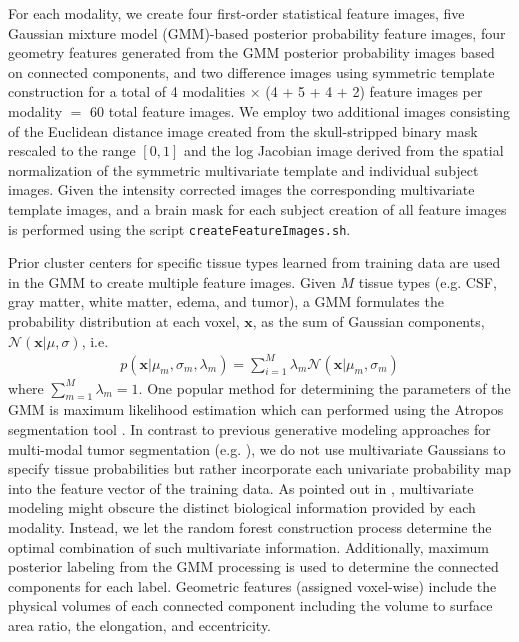 \documentclass[final,5p,times,twocolumn]{elsarticle}
\begin{document}
For each modality, we create four first-order statistical feature images,
five Gaussian mixture model (GMM)-based posterior probability feature images,
four geometry features generated from the GMM posterior probability images
based on connected components, and two difference images using symmetric template
construction for a total of 4 modalities $\times$ (4 + 5 + 4 + 2) feature images per modality $=$ 60 total
feature images.  We employ two additional images consisting of the 
Euclidean distance image \cite{maurer2003} created from the skull-stripped 
binary mask rescaled to the range $[0,1]$ and the log
Jacobian image derived from the spatial normalization of the symmetric multivariate template and individual subject images.  Given the intensity corrected images
the corresponding multivariate template images, and a brain mask for each subject
creation of all feature images is performed using the script \verb#createFeatureImages.sh#.

Prior  cluster centers for specific tissue types learned from training data \cite{reynolds2009} are used in the GMM to create multiple feature images.  
Given $M$ tissue types (e.g. CSF, gray matter,
white matter, edema, and tumor), a GMM formulates the 
probability distribution at each voxel, $\mathbf{x}$, as the
sum of Gaussian components, $\mathcal{N}(\mathbf{x}|\mu,\sigma)$, i.e.
\begin{align}
p\left(\mathbf{x}|\mu_m,\sigma_m,\lambda_m\right) = \sum_{i=1}^M \lambda_m \mathcal{N}(\mathbf{x}|\mu_m,\sigma_m)
\end{align}
where $\sum_{m=1}^M \lambda_m = 1$.  One popular method for 
determining the parameters of the GMM is maximum likelihood 
estimation which can performed using the Atropos segmentation 
tool \cite{avants2011}.  In contrast to previous generative
modeling approaches for multi-modal tumor segmentation 
(e.g. \cite{prastawa2003,zikic2012}), we do not use multivariate 
Gaussians to specify tissue probabilities but rather incorporate each
univariate probability map into the feature vector of the training
data.  As pointed out in \cite{menze2010}, multivariate modeling
might obscure the distinct biological information provided by each 
modality.  Instead, we let the random forest construction 
process determine the optimal combination of such multivariate
information.
Additionally, maximum posterior labeling from the GMM processing
is used to determine the connected components for each label.  
Geometric features (assigned voxel-wise) include the physical volumes 
of each connected component including the volume to surface area ratio, 
the elongation, and eccentricity. 
\end{document}
